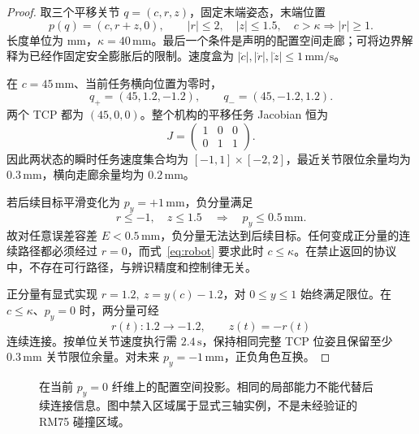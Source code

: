 \documentclass[11pt,a4paper]{article}
\theoremstyle{cn}
\newcommand{\mm}{\,\mathrm{mm}}
\begin{document}
\begin{proof}
取三个平移关节 \(q=(c,r,z)\)，固定末端姿态，末端位置
\begin{equation}
p(q)=(c,r+z,0),\qquad
|r|\le2,\quad |z|\le1.5,\quad
c>\kappa\Longrightarrow |r|\ge1.
\label{eq:robot}
\end{equation}
长度单位为 \(\mathrm{mm}\)，\(\kappa=40\mm\)。最后一个条件是声明的配置空间走廊；可将边界解释为已经作固定安全膨胀后的限制。速度盒为 \(|\dot c|,|\dot r|,|\dot z|\le1\mm/\mathrm{s}\)。

在 \(c=45\mm\)、当前任务横向位置为零时，
\[
q_+=(45,1.2,-1.2),\qquad q_-=(45,-1.2,1.2).
\]
两个 TCP 都为 \((45,0,0)\)。整个机构的平移任务 Jacobian 恒为
\begin{equation}
J=\begin{pmatrix}1&0&0\\0&1&1\end{pmatrix}.
\label{eq:samej}
\end{equation}
因此两状态的瞬时任务速度集合均为
\([-1,1]\times[-2,2]\)，最近关节限位余量均为 \(0.3\mm\)，横向走廊余量均为 \(0.2\mm\)。

若后续目标平滑变化为 \(p_y=+1\mm\)，负分量满足
\[
r\le-1,\quad z\le1.5\quad\Longrightarrow\quad p_y\le0.5\mm.
\]
故对任意误差容差 \(E<0.5\mm\)，负分量无法达到后续目标。任何变成正分量的连续路径都必须经过 \(r=0\)，而式~\eqref{eq:robot} 要求此时 \(c\le\kappa\)。在禁止返回的协议中，不存在可行路径，与辨识精度和控制律无关。

正分量有显式实现 \(r=1.2,\ z=y(c)-1.2\)，对 \(0\le y\le1\) 始终满足限位。在 \(c\le\kappa\)、\(p_y=0\) 时，两分量可经
\[
r(t):1.2\longrightarrow-1.2,\qquad z(t)=-r(t)
\]
连续连接。按单位关节速度执行需 \(2.4\,\mathrm{s}\)，保持相同完整 TCP 位姿且保留至少 \(0.3\mm\) 关节限位余量。对未来 \(p_y=-1\mm\)，正负角色互换。
\end{proof}

\begin{figure}[htbp]
\centering
{}
\caption{在当前 \(p_y=0\) 纤维上的配置空间投影。相同的局部能力不能代替后续连接信息。图中禁入区域属于显式三轴实例，不是未经验证的 RM75 碰撞区域。}
\label{fig:gate}
\end{figure}
\end{document}
